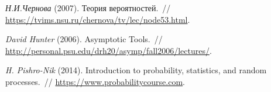 \documentclass[12pt, a4paper, oneside]{article}
\begin{document}
\begin{thebibliography}{1}
	\emph{Н.И.Чернова} (2007).
	Теория вероятностей.~//
	\url{https://tvims.nsu.ru/chernova/tv/lec/node53.html}.
	
	\emph{David Hunter} (2006).
	Asymptotic Tools.~//
	\url{http://personal.psu.edu/drh20/asymp/fall2006/lectures/}.	
	
	\emph{H. Pishro-Nik} (2014).
	Introduction to probability, statistics, and random processes.~//
	\url{https://www.probabilitycourse.com}.	
\end{thebibliography}
\end{document}

